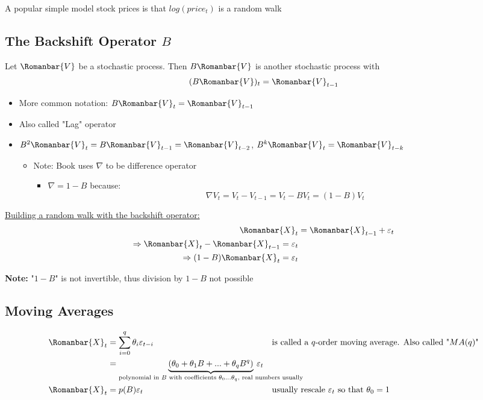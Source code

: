 A popular simple model stock prices is that $log(price_t)$ is a random walk

\subsection{The Backshift Operator $B$}

Let $\Romanbar{V}$ be a stochastic process. Then $B\Romanbar{V}$ is another stochastic process with $$(B\Romanbar{V})_t=\Romanbar{V}_{t-1}$$

\begin{itemize}
    \item More common notation: $B\Romanbar{V}_t=\Romanbar{V}_{t-1}$
    \item Also called "Lag" operator 
    \item $B^2\Romanbar{V}_t=B\Romanbar{V}_{t-1}=\Romanbar{V}_{t-2}$, \quad $B^k\Romanbar{V}_t=\Romanbar{V}_{t-k}$
    \begin{itemize}
        \item[] Note: Book uses $\nabla$ to be difference operator 
        \begin{itemize}
            \item[] $\nabla=1-B$ because: 
            $$\nabla V_t = V_t-V_{t-1}=V_t-BV_t=(1-B)V_t$$
        \end{itemize}
    \end{itemize}
\end{itemize}

\underline{Building a random walk with the backshift operator:}
\bigskip
\begin{align*}
    \Romanbar{X}_t&=\Romanbar{X}_{t-1}+\varepsilon_t\\
    \Rightarrow \Romanbar{X}_t-\Romanbar{X}_{t-1}=\varepsilon_t\\
    \Rightarrow(1-B)\Romanbar{X}_t=\varepsilon_t
\end{align*}

\textbf{Note:} "$1-B$" is not invertible, thus division by $1-B$ not possible

\subsection{Moving Averages}

\begin{align*}
  \Romanbar{X}_t&=\sum_{i=0}^q \theta_i\varepsilon_{t-i} &&\text{is called a $q$-order moving average. Also called "$MA(q)$"} \\
  &= \underbrace{(\theta_0+\theta_1B+...+\theta_qB^q)}_{\text{polynomial in $B$ with coefficients $\theta_0...\theta_q$, real numbers usually}}\!\!\!\!\!\!\!\!\!\!\!\!\!\!\!\!\!\!\!\!\!\!\!\!\!\!\!\!\!\!\!\!\!\!\varepsilon_t \\
  \Romanbar{X}_t&=p(B)\varepsilon_t &&\text{usually rescale $\varepsilon_t$ so that $\theta_0=1$}
\end{align*}

